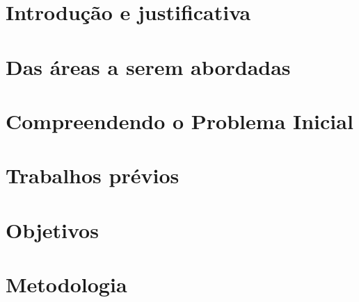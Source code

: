 \documentclass[12pt,a4paper]{article}
\makeatletter
\renewcommand\tableofcontents{%
    \section*{\huge\centering\contentsname
        \@mkboth{%
           \MakeUppercase\contentsname}{\MakeUppercase\contentsname}}%
           \vspace{24pt}%
    \@starttoc{toc}%
    \newpage%
}
\makeatother
\begin{document}
\noindent{}
\newpage
\pagestyle{empty} %
\tableofcontents
\newpage
\setcounter{page}{1}
\pagestyle{plain} %

\section{Introdução e justificativa}
\label{section:introduction}


\section{Das áreas a serem abordadas}
\label{section:rl_mm}


\section{Compreendendo o Problema Inicial}
\label{section:problem_description}


\section{Trabalhos prévios}
\label{section:previous_works}


\section{Objetivos}
\label{section:objectives}


\section{Metodologia}
\label{section:methodology}



\newpage



\end{document}

